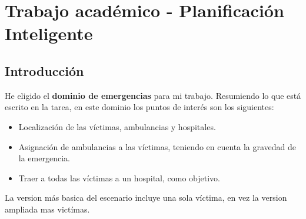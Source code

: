 

\chapter{Trabajo académico - Planificación Inteligente}

\lstset{language=python}




\section{Introducción}

{He eligido el \textbf{dominio de emergencias} para mi trabajo. Resumiendo lo que está escrito en la tarea, en este dominio los puntos de interés son los siguientes:\ns
\begin{itemize}
   \item Localización de las víctimas, ambulancias y hospitales.
   \item Asignación de ambulancias a las víctimas, teniendo en cuenta la gravedad de la emergencia.
   \item Traer a todas las víctimas a un hospital, como objetivo.
\end{itemize}}

La version más basica del escenario incluye una sola víctima, en vez la version ampliada mas victímas.

